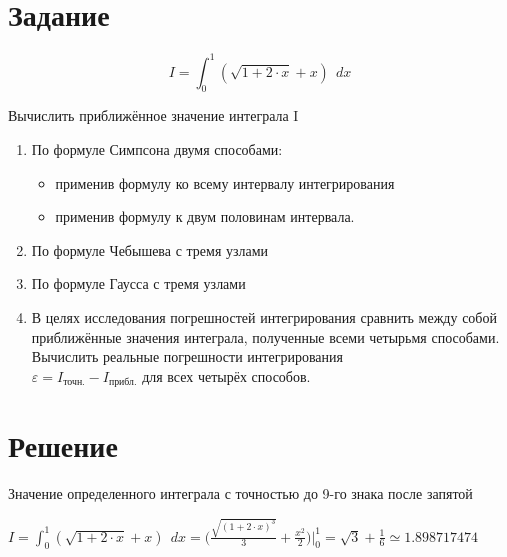 





\section{Задание}

\begin{displaymath}
I = \int_{0}^{1} (\sqrt{1 + 2 \cdot x} + x)\ \ dx
\end{displaymath}

Вычислить приближённое значение интеграла I

\begin{enumerate}

\item По формуле Симпсона двумя способами:

\begin{itemize}

\item применив формулу ко всему интервалу интегрирования

\item применив формулу к двум половинам интервала.

\end{itemize}

\item По формуле Чебышева с тремя узлами

\item По формуле Гаусса с тремя узлами

\item В целях исследования погрешностей интегрирования сравнить между собой приближённые значения интеграла, полученные всеми четырьмя способами. Вычислить реальные погрешности интегрирования \\ $\varepsilon = I_\text{точн.} - I_\text{прибл.}$ для всех четырёх способов.

\end{enumerate}

\section{Решение}

Значение определенного интеграла с точностью до 9-го знака после запятой

$I = \int_{0}^{1} (\sqrt{1 + 2 \cdot x} + x)\ \ dx = \Big ( \frac{\sqrt{(1 + 2 \cdot x)^3}}{3} + \frac{x^2}{2} \Big ) \Big |_0^1 = \sqrt{3} + \frac{1}{6} \simeq 1.898717474$

